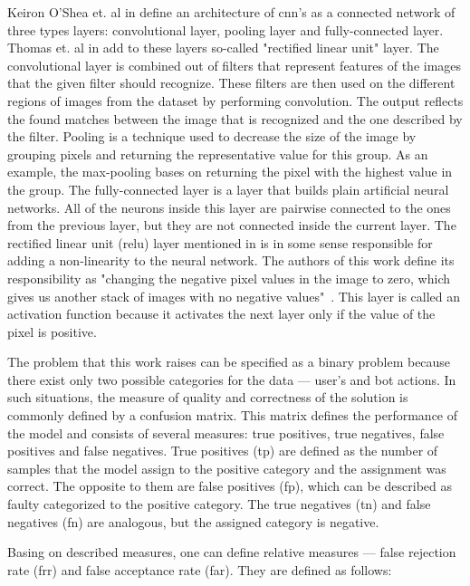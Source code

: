 Keiron O'Shea et. al in \cite{cnn-description} define an architecture of \gls{cnn}'s as a connected network of three types layers: convolutional layer, pooling layer and fully-connected layer.
Thomas et. al in \cite{thomas2020machine} add to these layers so-called "rectified linear unit" layer.
The convolutional layer is combined out of filters that represent features of the images that the given filter should recognize.
These filters are then used on the different regions of images from the dataset by performing convolution.
The output reflects the found matches between the image that is recognized and the one described by the filter.
Pooling is a technique used to decrease the size of the image by grouping pixels and returning the representative value for this group.
As an example, the max-pooling bases on returning the pixel with the highest value in the group.
The fully-connected layer is a layer that builds plain artificial neural networks.
All of the neurons inside this layer are pairwise connected to the ones from the previous layer, but they are not connected inside the current layer.
The rectified linear unit (\gls{relu}) layer mentioned in \cite{thomas2020machine} is in some sense responsible for adding a non-linearity to the neural network.
The authors of this work define its responsibility as "changing the negative pixel values in the image to zero, which gives us another stack of images with no negative values"~\cite{thomas2020machine}.
This layer is called an activation function because it activates the next layer only if the value of the pixel is positive.

The problem that this work raises can be specified as a binary problem because there exist only two possible categories for the data --- user's and bot actions.
In such situations, the measure of quality and correctness of the solution is commonly defined by a confusion matrix.
This matrix defines the performance of the model and consists of several measures: true positives, true negatives, false positives and false negatives.
True positives (\gls{tp}) are defined as the number of samples that the model assign to the positive category and the assignment was correct.
The opposite to them are false positives (\gls{fp}), which can be described as faulty categorized to the positive category.
The true negatives (\gls{tn}) and false negatives (\gls{fn}) are analogous, but the assigned category is negative.

Basing on described measures, one can define relative measures --- false rejection rate (\gls{frr}) and false acceptance rate (\gls{far}).
They are defined as follows:

